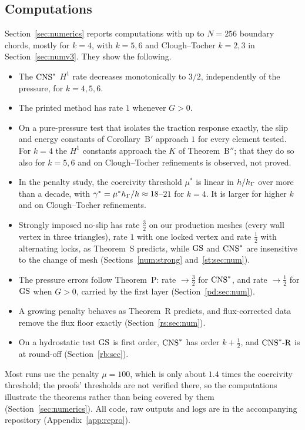 \subsection*{Computations}
Section~\ref{sec:numerics} reports computations with up to $N=256$ boundary chords, mostly for $k=4$, with $k=5,6$ and Clough--Tocher $k=2,3$ in Section~\ref{sec:numv3}. They show the following.
\begin{itemize}
\item The $\mathrm{CNS}^\ast$ $H^1$ rate decreases monotonically to $3/2$, independently of the pressure, for $k=4,5,6$.
\item The printed method has rate $1$ whenever $G>0$.
\item On a pure-pressure test that isolates the traction response exactly, the slip and energy constants of Corollary~B$'$ approach $1$ for every element tested. For $k=4$ the $H^1$ constants approach the $K$ of Theorem~B$''$; that they do so also for $k=5,6$ and on Clough--Tocher refinements is observed, not proved.
\item In the penalty study, the coercivity threshold $\mu^\ast$ is linear in $h/h_\Gamma$ over more than a decade, with $\gamma^\ast=\mu^\ast h_\Gamma/h\approx18$--$21$ for $k=4$. It is larger for higher $k$ and on Clough--Tocher refinements.
\item Strongly imposed no-slip has rate $\frac32$ on our production meshes (every wall vertex in three triangles), rate $1$ with one locked vertex and rate $\frac12$ with alternating locks, as Theorem~S predicts, while $\mathrm{GS}$ and $\mathrm{CNS}^\ast$ are insensitive to the change of mesh (Sections~\ref{num:strong} and~\ref{st:sec:num}).
\item The pressure errors follow Theorem~P: rate $\to\frac32$ for $\mathrm{CNS}^\ast$, and rate $\to\frac12$ for $\mathrm{GS}$ when $G>0$, carried by the first layer (Section~\ref{pd:sec:num}).
\item A growing penalty behaves as Theorem~R predicts, and flux-corrected data remove the flux floor exactly (Section~\ref{rs:sec:num}).
\item On a hydrostatic test $\mathrm{GS}$ is first order, $\mathrm{CNS}^\ast$ has order $k+\frac12$, and $\mathrm{CNS}^\ast\text{-R}$ is at round-off (Section~\ref{rb:sec}).
\end{itemize}
Most runs use the penalty $\mu=100$, which is only about $1.4$ times the coercivity threshold; the proofs' thresholds are not verified there, so the computations illustrate the theorems rather than being covered by them (Section~\ref{sec:numerics}).
All code, raw outputs and logs are in the accompanying repository (Appendix~\ref{app:repro}).


